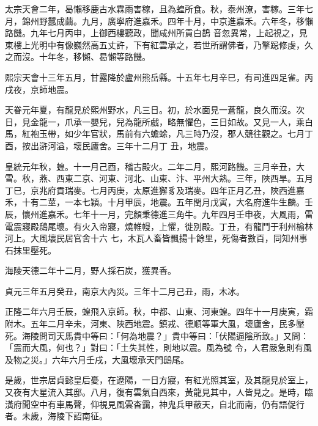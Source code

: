 \begin{pinyinscope}
 太宗天會二年，曷懶移鹿古水霖雨害稼，且為蝗所食。秋，泰州潦，害稼。三年七月，錦州野蠶成繭。九月，廣寧府進嘉禾。四年十月，中京進嘉禾。六年冬，移懶路饑。九年七月丙申，上御西樓聽政，聞咸州所貢白鵲
 音忽異常，上起視之，見東樓上光明中有像巍然高五丈許，下有紅雲承之，若世所謂佛者，乃擎跽修虔，久之而沒。十年冬，移懶、曷懶等路饑。



 熙宗天會十三年五月，甘露降於盧州熊岳縣。十五年七月辛巳，有司進四足雀。丙戌夜，京師地震。



 天眷元年夏，有龍見於熙州野水，凡三日。初，於水面見一蒼龍，良久而沒。次日，見金龍一，爪承一嬰兒，兒為龍所戲，略無懼色，三日如故。又見一人，乘白馬，紅袍玉帶，如少年官狀，馬前有六蟾蜍，凡三時乃沒，郡人競往觀之。七月丁酉，按出滸河溢，壞民廬舍。三年十二月丁
 丑，地震。



 皇統元年秋，蝗。十一月己酉，稽古殿火。二年二月，熙河路饑。三月辛丑，大雪。秋，燕、西東二京、河東、河北、山東、汴、平州大熟。三年，陜西旱。五月丁巳，京兆府貢瑞麥。七月丙庚，太原進獬豸及瑞麥。四年正月乙丑，陜西進嘉禾，十有二莖，一本七穎。十月甲辰，地震。五年閏月戊寅，大名府進牛生麟。壬辰，懷州進嘉禾。七年十一月，完顏秉德進三角牛。九年四月壬申夜，大風雨，雷電震寢殿鴟尾壞。有火入帝寢，燒帷幔，上懼，徙別殿。丁丑，有龍鬥于利州榆林河上。大風壞民居官舍十六
 七，木瓦人畜皆飄揚十餘里，死傷者數百，同知州事石抹里壓死。



 海陵天德二年十二月，野人採石炭，獲異香。



 貞元三年五月癸丑，南京大內災。三年十二月己丑，雨，木冰。



 正隆二年六月壬辰，蝗飛入京師。秋，中都、山東、河東蝗。四年十一月庚寅，霜附木。五年二月辛未，河東、陜西地震。鎮戎、德順等軍大風，壞廬舍，民多壓死。海陵問司天馬貴中等曰：「何為地震？」貴中等曰：「伏陽逼陰所致。」又問：「震而大風，何也？」對曰：「土失其性，則地以震。風為號
 令，人君嚴急則有風及物之災。」六年六月壬戌，大風壞承天門鴟尾。



 是歲，世宗居貞懿皇后憂，在遼陽，一日方寢，有紅光照其室，及其龍見於室上，又夜有大星流入其邸。八月，復有雲氣自西來，黃龍見其中，人皆見之。是時，臨潢府聞空中有車馬聲，仰視見風雲杳靄，神鬼兵甲蔽天，自北而南，仍有語促行者。未歲，海陵下詔南征。




\end{pinyinscope}
